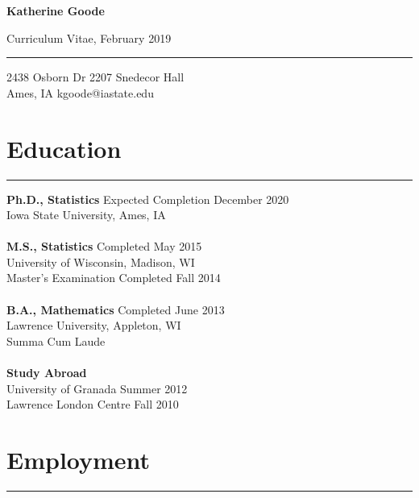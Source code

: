 \documentclass[11pt, oneside]{article}
\begin{document}
\begin{LARGE} \noindent\textbf{Katherine Goode} \end{LARGE} \hfill Curriculum Vitae, February 2019\\
\rule{\textwidth}{1pt}
2438 Osborn Dr \hfill{2207 Snedecor Hall}\\
Ames, IA \hfill{kgoode@iastate.edu}\\

\section*{Education}
\hrule
\vspace{0.5cm}

\textbf{Ph.D., Statistics} \hfill{Expected Completion December 2020}\\
Iowa State University, Ames, IA\\
\\
\textbf{M.S., Statistics} \hfill{Completed May 2015}\\
University of Wisconsin, Madison, WI\\
Master's Examination Completed Fall 2014\\
\\
\textbf{B.A., Mathematics} \hfill{Completed June 2013}\\
Lawrence University, Appleton, WI\\
Summa Cum Laude\\
\\
\textbf{Study Abroad}\\
University of Granada \hfill{Summer 2012}\\
Lawrence London Centre \hfill{Fall 2010}\\

\section*{Employment}
\hrule
\vspace{0.5cm}
\end{document}
